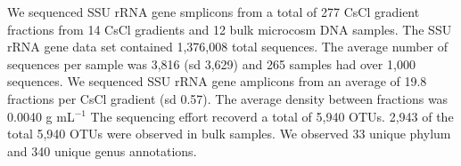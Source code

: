 We sequenced SSU rRNA gene smplicons from a total of 277 CsCl gradient fractions from 14 
CsCl gradients and 
12 bulk microcosm DNA samples. The SSU rRNA gene data set contained 1,376,008 total sequences.
The average number of sequences per sample was 3,816 (sd 3,629) and 265 samples had over 1,000
sequences. We sequenced SSU rRNA gene amplicons from an average of 19.8 fractions per CsCl
gradient (sd 0.57). The average density between fractions was  0.0040 g mL$^{-1}$ 
The sequencing effort recoverd a total of 5,940 OTUs. 2,943 of the total
5,940 OTUs were observed in bulk samples. We observed 33 unique phylum and 340 unique genus
annotations.